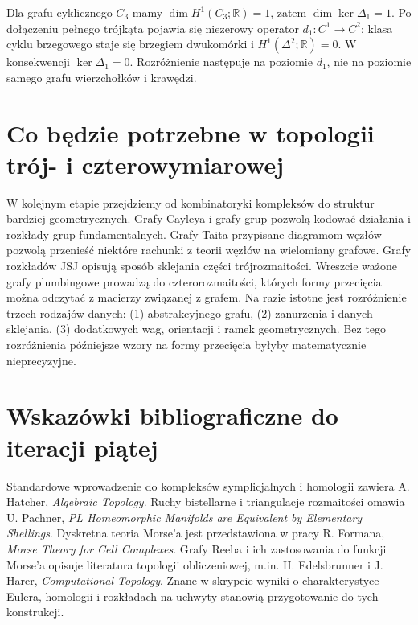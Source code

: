 \begin{przyklad}
Dla grafu cyklicznego $C_3$ mamy
$\dim H^1(C_3;\mathbb R)=1$, zatem
$\dim\ker\Delta_1=1$. Po dołączeniu
pełnego trójkąta pojawia się niezerowy operator
$d_1:C^1\to C^2$; klasa cyklu brzegowego staje
się brzegiem dwukomórki i
$H^1(\Delta^2;\mathbb R)=0$.
W konsekwencji $\ker\Delta_1=0$.
Rozróżnienie następuje na poziomie $d_1$,
nie na poziomie samego grafu wierzchołków i krawędzi.
\end{przyklad}

\section{Co będzie potrzebne w topologii trój- i czterowymiarowej}
\label{sec:tg-roadmap-topology}

\begin{uwaga}
W kolejnym etapie przejdziemy od kombinatoryki
kompleksów do struktur bardziej geometrycznych.
Grafy Cayleya i grafy grup pozwolą kodować działania
i rozkłady grup fundamentalnych. Grafy Taita
przypisane diagramom węzłów pozwolą przenieść
niektóre rachunki z teorii węzłów na wielomiany grafowe.
Grafy rozkładów JSJ opisują sposób sklejania części
trójrozmaitości. Wreszcie ważone grafy plumbingowe
prowadzą do czterorozmaitości, których formy przecięcia
można odczytać z macierzy związanej z grafem.
Na razie istotne jest rozróżnienie trzech rodzajów danych:
(1) abstrakcyjnego grafu, (2) zanurzenia i danych sklejania,
(3) dodatkowych wag, orientacji i ramek geometrycznych.
Bez tego rozróżnienia późniejsze wzory na formy przecięcia
byłyby matematycznie nieprecyzyjne.
\end{uwaga}

\section*{Wskazówki bibliograficzne do iteracji piątej}
Standardowe wprowadzenie do kompleksów symplicjalnych i
homologii zawiera A. Hatcher, \emph{Algebraic Topology}.
Ruchy bistellarne i triangulacje rozmaitości omawia
U. Pachner, \emph{PL Homeomorphic Manifolds are Equivalent
by Elementary Shellings}.
Dyskretna teoria Morse'a jest przedstawiona w pracy
R. Formana, \emph{Morse Theory for Cell Complexes}.
Grafy Reeba i ich zastosowania do funkcji Morse'a
opisuje literatura topologii obliczeniowej, m.in.
H. Edelsbrunner i J. Harer, \emph{Computational Topology}.
Znane w skrypcie wyniki o charakterystyce Eulera,
homologii i rozkładach na uchwyty stanowią
przygotowanie do tych konstrukcji.


